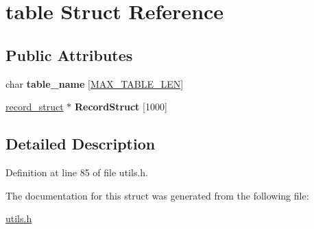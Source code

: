 \hypertarget{structtable}{\section{table Struct Reference}
\label{structtable}
}
\subsection*{Public Attributes}
\begin{DoxyCompactItemize}
\item 
\hypertarget{structtable_a1d57fd21d6a321d7aa75512a688b23b0}{char {\bfseries table\-\_\-name} \mbox{[}\hyperlink{storage_8h_ae7854bc280576d57ec5c80995d5ea94c}{M\-A\-X\-\_\-\-T\-A\-B\-L\-E\-\_\-\-L\-E\-N}\mbox{]}}\label{structtable_a1d57fd21d6a321d7aa75512a688b23b0}

\item 
\hypertarget{structtable_aeb1016a013d8a611aa062d1a2337cb0a}{\hyperlink{structrecord__struct}{record\-\_\-struct} $\ast$ {\bfseries Record\-Struct} \mbox{[}1000\mbox{]}}\label{structtable_aeb1016a013d8a611aa062d1a2337cb0a}

\end{DoxyCompactItemize}


\subsection{Detailed Description}


Definition at line 85 of file utils.\-h.



The documentation for this struct was generated from the following file\-:\begin{DoxyCompactItemize}
\item 
\hyperlink{utils_8h}{utils.\-h}\end{DoxyCompactItemize}
